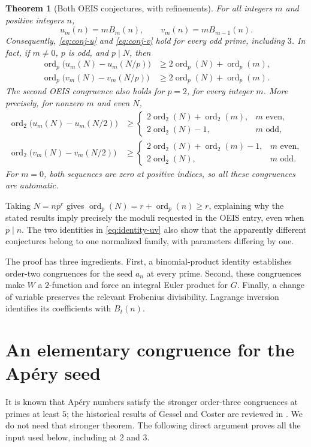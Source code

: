 \documentclass[11pt,letterpaper]{article}
\numberwithin{equation}{section}
\newtheorem{theorem}{Theorem}[section]
\theoremstyle{definition}
\theoremstyle{remark}
\newcommand{\vp}{\operatorname{ord}_p}
\newcommand{\vtwo}{\operatorname{ord}_2}
\begin{document}
\begin{theorem}[Both OEIS conjectures, with refinements]\label{thm:OEIS}
For all integers $m$ and positive integers $n$,
\begin{equation}\label{eq:identity-uv}
 u_m(n)=mB_m(n),\qquad v_m(n)=mB_{m-1}(n).
\end{equation}
Consequently, \eqref{eq:conj-u} and \eqref{eq:conj-v} hold for every odd
prime, including $3$. In fact, if $m\ne0$, $p$ is odd, and $p\mid N$, then
\begin{align}
 \vp\bigl(u_m(N)-u_m(N/p)\bigr)&\ge2\vp(N)+\vp(m),\label{eq:strong-u}\\
 \vp\bigl(v_m(N)-v_m(N/p)\bigr)&\ge2\vp(N)+\vp(m).\label{eq:strong-v}
\end{align}
The second OEIS congruence also holds for $p=2$, for every integer $m$.
More precisely, for nonzero $m$ and even $N$,
\begin{align}
 \vtwo\bigl(u_m(N)-u_m(N/2)\bigr)&\ge
 \begin{cases}
 2\vtwo(N)+\vtwo(m),&m\text{ even},\\
 2\vtwo(N)-1,&m\text{ odd},
 \end{cases}\label{eq:u-two}\\
 \vtwo\bigl(v_m(N)-v_m(N/2)\bigr)&\ge
 \begin{cases}
 2\vtwo(N)+\vtwo(m)-1,&m\text{ even},\\
 2\vtwo(N),&m\text{ odd}.
 \end{cases}\label{eq:v-two}
\end{align}
For $m=0$, both sequences are zero at positive indices, so all these
congruences are automatic.
\end{theorem}

Taking $N=np^r$ gives $\vp(N)=r+\vp(n)\ge r$, explaining why the stated
results imply precisely the moduli requested in the OEIS entry, even
when $p\mid n$. The two identities in \eqref{eq:identity-uv} also show
that the apparently different conjectures belong to one normalized
family, with parameters differing by one.

The proof has three ingredients. First, a binomial-product identity
establishes order-two congruences for the seed $a_n$ at every prime.
Second, these congruences make $W$ a $2$-function and force an integral
Euler product for $G$. Finally, a change of variable preserves the relevant
Frobenius divisibility. Lagrange inversion identifies its coefficients
with $B_t(n)$.

\section{An elementary congruence for the Ap\'ery seed}\label{sec:seed}
It is known that Ap\'ery numbers satisfy the stronger order-three
congruences at primes at least $5$; the historical results of Gessel and
Coster are reviewed in \cite{liu}. We do not need that stronger theorem.
The following direct argument proves all the input used below, including
at $2$ and $3$.
\end{document}

